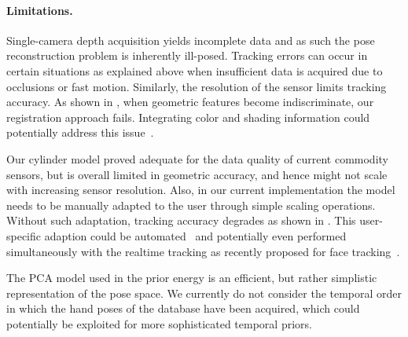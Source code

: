 



\paragraph*{Limitations.}


Single-camera depth acquisition yields incomplete data and as such the pose reconstruction problem is inherently ill-posed.
Tracking errors can occur in certain situations as explained above when insufficient data is acquired due to occlusions or fast motion.
Similarly, the resolution of the sensor limits tracking accuracy. As shown in , when geometric features become indiscriminate, our registration approach fails. Integrating color and shading information could potentially address this issue~\cite{delagorce_pami11}.

Our cylinder model proved adequate for the data quality of current commodity sensors, but is overall limited in geometric accuracy, and hence might not scale with increasing sensor resolution.
Also, in our current implementation the model needs to be manually adapted to the user through simple scaling operations. Without such adaptation, tracking accuracy degrades as shown in .
This user-specific adaption could be automated~\cite{Taylor_cvpr14} and potentially even performed simultaneously with the realtime tracking as recently proposed for face tracking~\cite{bouaziz_sig13}.

The PCA model used in the prior energy is an efficient, but rather simplistic representation of the pose space. We currently do not consider the
temporal order in which the hand poses of the database have been acquired, which could potentially be exploited for more sophisticated temporal priors. 


